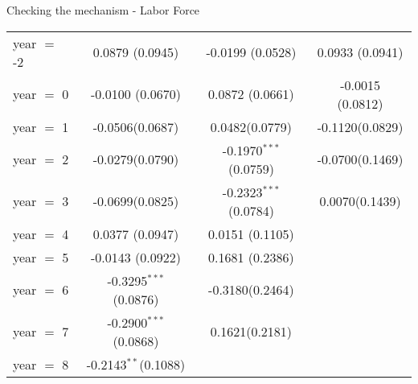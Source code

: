 \documentclass[9pt]{beamer}
\begin{document}
\begin{frame}{Checking the mechanism - Labor Force}
\begin{center}
\begin{tabular}{lccc}
   year $=$ -2  & 0.0879     (0.0945)        & -0.0199 (0.0528)           & 0.0933 (0.0941)\\   
   year $=$ 0   & -0.0100  (0.0670)        & 0.0872 (0.0661)            & -0.0015 (0.0812)\\   
   year $=$ 1   & -0.0506(0.0687)          & 0.0482(0.0779)          & -0.1120(0.0829)\\   
   year $=$ 2   & -0.0279(0.0790)           & -0.1970$^{***}$(0.0759) & -0.0700(0.1469)\\   
   year $=$ 3   & -0.0699(0.0825)           & -0.2323$^{***}$(0.0784) & 0.0070(0.1439)\\   
   year $=$ 4   & 0.0377 (0.0947)           & 0.0151 (0.1105)          &   \\   
   year $=$ 5   & -0.0143 (0.0922)        & 0.1681 (0.2386)           &   \\   
   year $=$ 6   & -0.3295$^{***}$(0.0876)   & -0.3180(0.2464)         &   \\   
   year $=$ 7   & -0.2900$^{***}$(0.0868) & 0.1621(0.2181)           &   \\   
   year $=$ 8   & -0.2143$^{**}$(0.1088)   &                 &   \\   
 

\end{tabular}
\end{center}
\end{frame}
\end{document}
